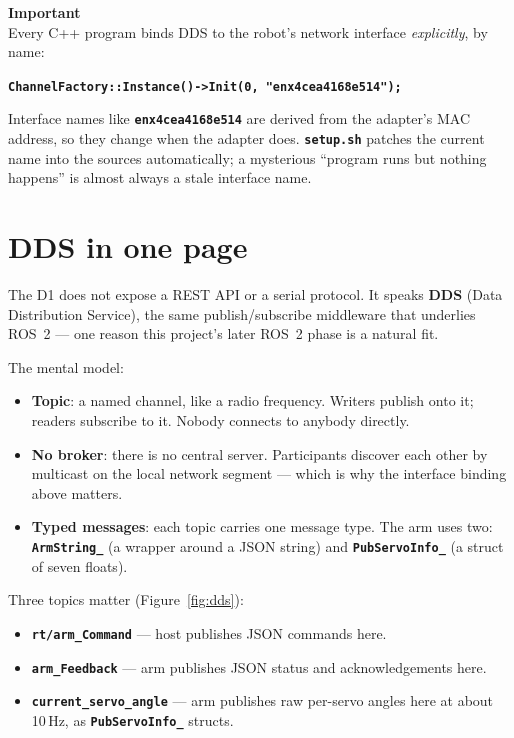 \documentclass[11pt,twoside,openright]{book}
\newcommand{\code}[1]{\texttt{\bfseries #1}}
\newenvironment{pktimportant}{\begin{pktbox}\textbf{Important}\\[4pt]}{\end{pktbox}}
\begin{document}
\begin{pktimportant}
Every C++ program binds DDS to the robot's network interface
\emph{explicitly}, by name:

\code{ChannelFactory::Instance()->Init(0, "enx4cea4168e514");}

Interface names like \code{enx4cea4168e514} are derived from the adapter's
MAC address, so they change when the adapter does. \code{setup.sh} patches
the current name into the sources automatically; a mysterious ``program
runs but nothing happens'' is almost always a stale interface name.
\end{pktimportant}

\section{DDS in one page}

The D1 does not expose a REST API or a serial protocol. It speaks
\textbf{DDS} (Data Distribution Service), the same publish/subscribe
middleware that underlies ROS~2 --- one reason this project's later ROS~2
phase is a natural fit.

The mental model:

\begin{itemize}
  \item \textbf{Topic}: a named channel, like a radio frequency. Writers
    publish onto it; readers subscribe to it. Nobody connects to anybody
    directly.
  \item \textbf{No broker}: there is no central server. Participants
    discover each other by multicast on the local network segment ---
    which is why the interface binding above matters.
  \item \textbf{Typed messages}: each topic carries one message type. The
    arm uses two: \code{ArmString\_} (a wrapper around a JSON string) and
    \code{PubServoInfo\_} (a struct of seven floats).
\end{itemize}

Three topics matter (Figure~\ref{fig:dds}):

\begin{itemize}
  \item \code{rt/arm\_Command} --- host publishes JSON commands here.
  \item \code{arm\_Feedback} --- arm publishes JSON status and
    acknowledgements here.
  \item \code{current\_servo\_angle} --- arm publishes raw per-servo
    angles here at about 10\,Hz, as \code{PubServoInfo\_} structs.
\end{itemize}
\end{document}
